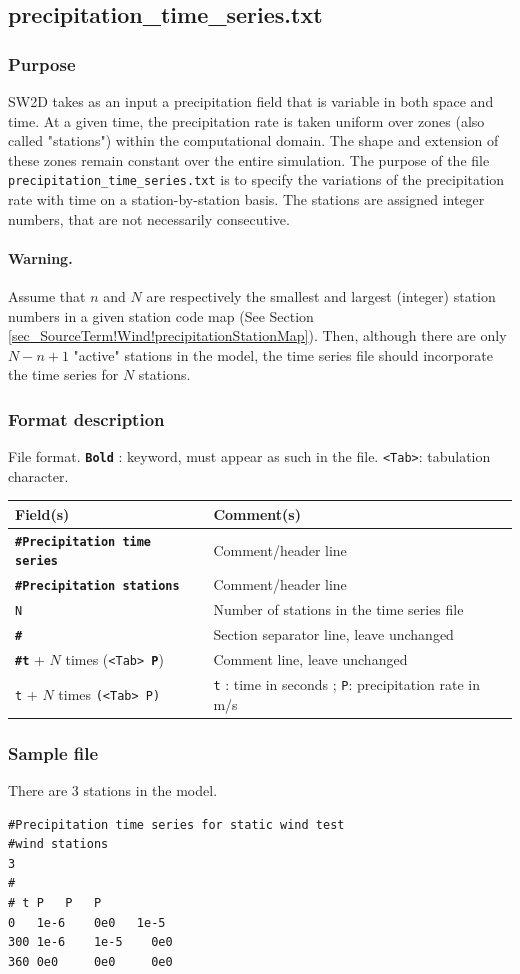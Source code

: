\subsection{precipitation\_time\_series.txt }

%
\subsubsection{Purpose}
SW2D takes as an input a precipitation field that is variable in both space and time. At a given time, the precipitation rate is taken uniform over zones (also called "stations") within the computational domain. The shape and extension of these zones remain constant over the entire simulation. The purpose of the file \texttt{precipitation\_time\_series.txt} is to specify the variations of the precipitation rate with time on a station-by-station basis. The stations are assigned integer numbers, that are not necessarily consecutive. 
%
\paragraph*{Warning.}
Assume that $n$ and $N$ are respectively the smallest and largest (integer) station numbers in a given station code map (See Section \ref{sec_SourceTerm!Wind!precipitationStationMap}). Then, although there are only $N - n + 1$ "active" stations in the model, the time series file should incorporate the time series for $N$ stations.
%
\subsubsection{Format description}
%
File format.  \texttt{\textbf{Bold}} : keyword, must appear as such in the file. \texttt{<Tab>}: tabulation character. \\
    \begin{tabular}{p{6cm} | p{9cm}}
    \hline
    Field(s) & Comment(s) \\
    \hline  \hline
    \texttt{\textbf{\#Precipitation time series}}  & Comment/header line \\ \hline
    \texttt{\textbf{\#Precipitation stations}}  & Comment/header line \\ \hline
    \texttt{N} & Number of stations in the time series file \\ \hline
    \texttt{\textbf{\#}} & Section separator line, leave unchanged \\  \hline
    \texttt{\textbf{\#t}} + $N$ times (\texttt{<Tab> \textbf{P}}) & Comment line, leave unchanged \\  \hline
    \texttt{t} + $N$ times \texttt{(<Tab> P)} & \texttt{t} : time in seconds ; \texttt{P}: precipitation rate in m/s  \\ \hline
    \end{tabular}
%    
\subsubsection{Sample file}
There are 3 stations in the model.
\begin{verbatim}
#Precipitation time series for static wind test
#wind stations
3
#
# t P   P   P
0 	1e-6    0e0   1e-5
300 1e-6    1e-5    0e0
360 0e0     0e0     0e0
\end{verbatim}